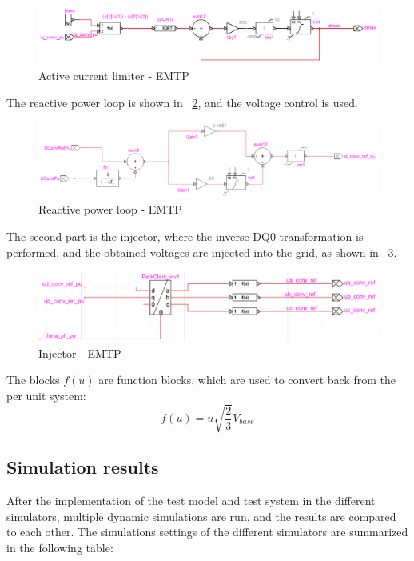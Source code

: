 \documentclass{report}
\begin{document}
\begin{figure}[H]
    \centering
    \includegraphics[scale = 0.62]{Figure_1VSC/1VSC_active_current_limiter_EMTP.png}
    \caption{Active current limiter - EMTP}
    \label{fig:1VSC_active_current_limiter_EMTP}
\end{figure}
The reactive power loop is shown in \figurename~\ref{fig:1VSC_reactive_power_EMTP}, and the voltage control is used.
\begin{figure}[H]
    \centering
    \includegraphics[scale = 0.67]{Figure_1VSC/1VSC_reactive_power_EMTP.png}
    \caption{Reactive power loop - EMTP}
    \label{fig:1VSC_reactive_power_EMTP}
\end{figure}
The second part is the injector, where the inverse DQ0 transformation is performed, and the obtained voltages are injected into the grid, as shown in \figurename~\ref{fig:1VSC_injector_EMTP}.
\begin{figure}[H]
    \centering
    \includegraphics[scale = 0.47]{Figure_1VSC/1VSC_injector_EMTP.png}
    \caption{Injector - EMTP}
    \label{fig:1VSC_injector_EMTP}
\end{figure}
The blocks $f(u)$ are function blocks, which are used to convert back from the per unit system:
\begin{equation}
    f(u) = u\sqrt{\frac{2}{3}}V_{base}
\end{equation}

\subsection{Simulation results}
After the implementation of the test model and test system in the different simulators, multiple dynamic simulations are run, and the results are compared to each other. The simulations settings of the different simulators are summarized in the following table:
\end{document}
